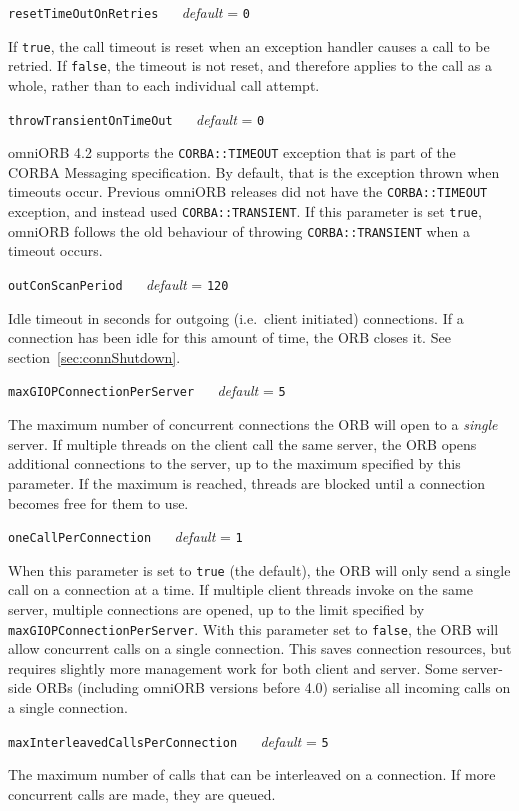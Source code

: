 \documentclass[11pt,oneside,a4paper]{book}
\makeatletter
\newcommand{\code}[1]{\texttt{#1}}
\newcommand{\confopt}[2]
  {\vspace{\baselineskip}\par\noindent\code{#1} ~~ \textit{default} =
   \code{#2}}
\renewcommand{\confopt}[2]
  {\vspace{\baselineskip}\par\noindent\code{#1} ~~ \textit{default} =
   \code{#2}\\[-1ex]\@afterheading}
\newcommand{\dsc}{\discretionary{}{}{}}
\makeatother
\begin{document}
\confopt{resetTimeOutOnRetries}{0}

If \code{true}, the call timeout is reset when an exception handler
causes a call to be retried. If \code{false}, the timeout is not
reset, and therefore applies to the call as a whole, rather than to
each individual call attempt.

\confopt{throwTransientOnTimeOut}{0}

omniORB 4.2 supports the \code{CORBA::TIMEOUT} exception that is part
of the CORBA Messaging specification. By default, that is the
exception thrown when timeouts occur. Previous omniORB releases did
not have the \code{CORBA::TIMEOUT} exception, and instead used
\code{CORBA::TRANSIENT}. If this parameter is set \code{true}, omniORB
follows the old behaviour of throwing \code{CORBA::TRANSIENT} when a
timeout occurs.


\confopt{outConScanPeriod}{120}

Idle timeout in seconds for outgoing (i.e.\ client initiated)
connections. If a connection has been idle for this amount of time,
the ORB closes it. See section~\ref{sec:connShutdown}.


\confopt{maxGIOPConnectionPerServer}{5}

The maximum number of concurrent connections the ORB will open to a
\emph{single} server. If multiple threads on the client call the same
server, the ORB opens additional connections to the server, up to the
maximum specified by this parameter. If the maximum is reached,
threads are blocked until a connection becomes free for them to use.


\confopt{oneCallPerConnection}{1}

When this parameter is set to \code{true} (the default), the ORB will
only send a single call on a connection at a time. If multiple client
threads invoke on the same server, multiple connections are opened, up
to the limit specified by
\code{maxGIOP\dsc{}ConnectionPerServer}. With this parameter set to
\code{false}, the ORB will allow concurrent calls on a single
connection. This saves connection resources, but requires slightly
more management work for both client and server. Some server-side ORBs
(including omniORB versions before 4.0) serialise all incoming calls
on a single connection.

\confopt{maxInterleavedCallsPerConnection}{5}

The maximum number of calls that can be interleaved on a connection.
If more concurrent calls are made, they are queued.
\end{document}
